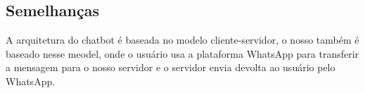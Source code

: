    \subsection{Semelhanças}
        A arquitetura do chatbot é baseada no modelo cliente-servidor, o nosso também é baseado nesse meodel, onde o usuário usa a plataforma WhatsApp para transferir a mensagem para o nosso servidor e o servidor envia devolta ao usuário pelo WhatsApp.